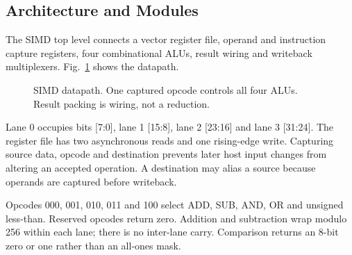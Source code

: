 \documentclass[conference]{IEEEtran}
\begin{document}
\subsection{Architecture and Modules}
The SIMD top level connects a vector register file, operand and instruction capture registers, four combinational ALUs, result wiring and writeback multiplexers. Fig.~\ref{fig:arch} shows the datapath.
\begin{figure}[t]
\centering
{}
\caption{SIMD datapath. One captured opcode controls all four ALUs. Result packing is wiring, not a reduction.}
\label{fig:arch}
\end{figure}

Lane 0 occupies bits [7:0], lane 1 [15:8], lane 2 [23:16] and lane 3 [31:24]. The register file has two asynchronous reads and one rising-edge write. Capturing source data, opcode and destination prevents later host input changes from altering an accepted operation. A destination may alias a source because operands are captured before writeback.

Opcodes 000, 001, 010, 011 and 100 select ADD, SUB, AND, OR and unsigned less-than. Reserved opcodes return zero. Addition and subtraction wrap modulo 256 within each lane; there is no inter-lane carry. Comparison returns an 8-bit zero or one rather than an all-ones mask.
\end{document}
